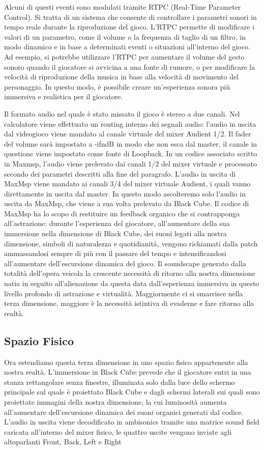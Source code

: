 	Alcuni di questi eventi sono modulati tramite RTPC (Real-Time Parameter Control). Si tratta di un sistema che consente di controllare i parametri sonori in tempo reale durante la riproduzione del gioco. 
	L'RTPC permette di modificare i valori di un parametro, come il volume o la frequenza di taglio di un filtro, in modo dinamico e in base a determinati eventi o situazioni all'interno del gioco. Ad esempio, si potrebbe utilizzare l'RTPC per aumentare il volume del gesto sonoro quando il giocatore si avvicina a una fonte di rumore, o per modificare la velocità di riproduzione della musica in base alla velocità di movimento del personaggio. In questo modo, è possibile creare un'esperienza sonora più immersiva e realistica per il giocatore.
	
	Il formato audio nel quale è stato missato il gioco è stereo a due canali. Nel calcolatore viene effettuato un routing interno dei segnali audio: l'audio in uscita dal videogioco viene mandato al canale virtuale del mixer Audient 1/2. Il fader del volume sarà impostato a -ifndB in modo che non esca dal master, il canale in questione viene impostato come fonte di Loopback. In un codice associato scritto in Maxmsp, l'audio viene prelevato dai canali 1/2 del mixer virtuale e processato secondo dei parametri descritti alla fine del paragrafo. L'audio in uscita di MaxMsp viene mandato ai canali 3/4 del mixer virtuale Audient, i quali vanno direttamente in uscita dal master. In questo modo ascolteremo solo l'audio in uscita da MaxMsp, che viene a sua volta prelevato da Black Cube.
	Il codice di MaxMsp ha lo scopo di restituire un feedback organico che si contrapponga all'astrazione: durante l'esperienza del giocatore, all'aumentare della sua immersione nella dimensione di Black Cube, dei suoni legati alla nostra dimensione, simboli di naturalezza e quotidianità, vengono richiamati dalla patch ammassandosi sempre di più con il passare del tempo e intensificandosi all'aumentare dell'escursione dinamica del gioco.
	Il soundscape generato dalla totalità dell'opera veicola la crescente necessità di ritorno alla nostra dimensione natia in seguito all'alienazione da questa data dall'esperienza immersiva in questo livello profondo di astrazione e virtualità. Maggiormente ci si smarrisce nella terza dimensione, maggiore è la necessità istintiva di evaderne e fare ritorno alla realtà.
	
	\subsection{Spazio Fisico}
	Ora estendiamo questa terza dimensione in uno spazio fisico appartenente alla nostra realtà. L'immersione in Black Cube prevede che il giocatore entri in una stanza rettangolare senza finestre, illuminata solo dalla luce dello schermo principale sul quale è proiettato Black Cube e dagli schermi laterali sui quali sono proiettate immagini della nostra dimensione, la cui luminosità aumenta all'aumentare  dell'escursione dinamica dei suoni organici generati dal codice.
	L'audio in uscita viene decodificato in ambisonics tramite una matrice sound field caricata all'interno del mixer fisico, le quattro uscite vengono inviate agli altoparlanti Front, Back, Left e Right
	
